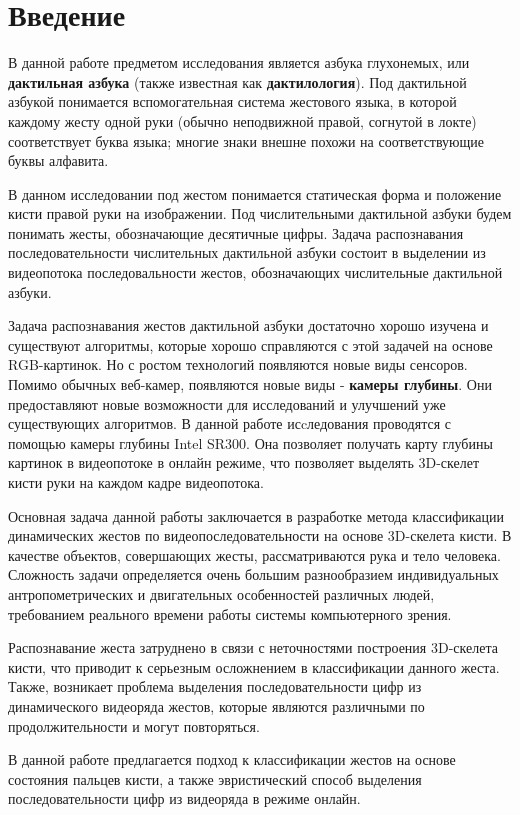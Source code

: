 \documentclass[12pt,a4paper]{article}
\theoremstyle{definition}
\begin{document}
\section{\textbf{Введение}} 
В данной работе предметом исследования является азбука глухонемых, или \textbf{дактильная азбука} (также известная как \textbf{дактилология}). Под дактильной азбукой понимается вспомогательная система жестового языка, в которой каждому жесту одной руки (обычно неподвижной правой, согнутой в локте) соответствует буква языка; многие знаки внешне похожи на соответствующие буквы алфавита.\par 
В данном исследовании под жестом понимается статическая форма и положение кисти правой руки на изображении. Под числительными дактильной азбуки будем понимать жесты, обозначающие десятичные цифры. Задача распознавания последовательности числительных дактильной азбуки состоит в выделении из видеопотока последовальности жестов, обозначающих числительные дактильной азбуки.\par 
Задача распознавания жестов дактильной азбуки достаточно хорошо изучена и существуют алгоритмы, которые хорошо справляются с этой задачей на основе RGB-картинок. Но с ростом технологий появляются	новые виды сенсоров. Помимо обычных веб-камер, появляются новые виды - \textbf{камеры глубины}. Они предоставляют новые возможности для исследований и улучшений уже существующих алгоритмов. В данной работе исcледования проводятся с помощью камеры глубины Intel SR300. Она позволяет получать карту глубины картинок в видеопотоке в онлайн режиме, что позволяет выделять 3D-скелет кисти руки на каждом кадре видеопотока.\par 
Основная задача данной работы заключается в раз­работке метода классификации динамических жестов по видеопоследователь­ности на основе 3D-скелета кисти. В качестве объектов, совершающих жесты, рассматриваются рука и тело человека. Сложность задачи определяется очень большим разнообразием индивидуальных антропометрических и двигательных особенностей различных людей, требованием реального времени работы системы компьютерного зрения.\par 
Распознавание жеста затруднено в связи с неточностями построения 3D-скелета кисти, что приводит к серьезным осложнением в классификации данного жеста. Также, возникает проблема выделения последовательности цифр из динамического видеоряда жестов, которые являются различными по продолжительности и могут повторяться.\par 
В данной работе предлагается подход к классификации жестов на основе состояния пальцев кисти, а также эвристический способ выделения последовательности цифр из видеоряда в режиме онлайн. 
\noindent 
\end{document}
